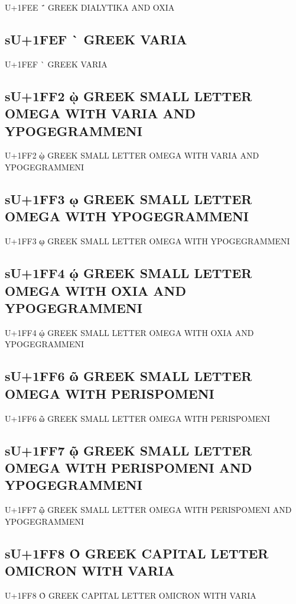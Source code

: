 U+1FEE ΅ GREEK DIALYTIKA AND OXIA

\subsection{sU+1FEF ` GREEK VARIA}

U+1FEF ` GREEK VARIA

\subsection{sU+1FF2 ῲ GREEK SMALL LETTER OMEGA WITH VARIA AND YPOGEGRAMMENI}

U+1FF2 ῲ GREEK SMALL LETTER OMEGA WITH VARIA AND YPOGEGRAMMENI

\subsection{sU+1FF3 ῳ GREEK SMALL LETTER OMEGA WITH YPOGEGRAMMENI}

U+1FF3 ῳ GREEK SMALL LETTER OMEGA WITH YPOGEGRAMMENI

\subsection{sU+1FF4 ῴ GREEK SMALL LETTER OMEGA WITH OXIA AND YPOGEGRAMMENI}

U+1FF4 ῴ GREEK SMALL LETTER OMEGA WITH OXIA AND YPOGEGRAMMENI

\subsection{sU+1FF6 ῶ GREEK SMALL LETTER OMEGA WITH PERISPOMENI}

U+1FF6 ῶ GREEK SMALL LETTER OMEGA WITH PERISPOMENI

\subsection{sU+1FF7 ῷ GREEK SMALL LETTER OMEGA WITH PERISPOMENI AND YPOGEGRAMMENI}

U+1FF7 ῷ GREEK SMALL LETTER OMEGA WITH PERISPOMENI AND YPOGEGRAMMENI

\subsection{sU+1FF8 Ὸ GREEK CAPITAL LETTER OMICRON WITH VARIA}

U+1FF8 Ὸ GREEK CAPITAL LETTER OMICRON WITH VARIA

